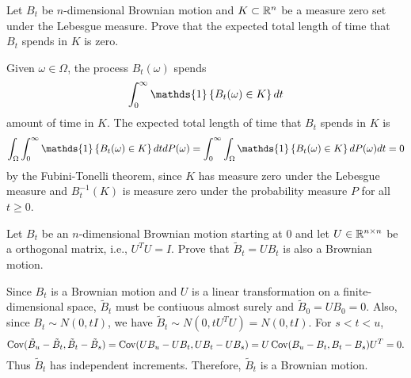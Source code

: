 \begin{exercise}{2.14}\label{ex:2.14}
    Let $B_t$ be $n$-dimensional Brownian motion and $K\subset\mathbb{R}^n$ be a measure 
    zero set under the Lebesgue measure. Prove that the expected total length 
    of time that $B_t$ spends in $K$ is zero. 
\end{exercise}
\begin{solution}
    Given $\omega\in\Omega$, the process $B_t(\omega)$ spends 
    \begin{equation*}
        \int_0^\infty \mathds{1}\set{B_t(\omega)\in K}dt
    \end{equation*} 
    amount of time in $K$. The expected total length of time that $B_t$ spends 
    in $K$ is 
    \begin{equation*}
        \int_{\Omega}\int_0^\infty\mathds{1}\set{B_t(\omega)\in K}dtdP(\omega) 
        = \int_0^\infty\int_{\Omega}\mathds{1}\set{B_t(\omega)\in K}dP(\omega)dt 
        = 0
    \end{equation*}
    by the Fubini-Tonelli theorem, since $K$ has measure zero under the Lebesgue measure 
    and $B_t^{-1}(K)$ is measure zero under the probability measure $P$ for all $t\geq 0$.
\end{solution}

\begin{exercise}{2.15}\label{ex:2.15}
    Let $B_t$ be an $n$-dimensional Brownian motion starting at $0$ and let 
    $U\in\mathbb{R}^{n\times n}$ be a orthogonal matrix, i.e., $U^TU = I$. Prove that 
    $\tilde{B}_t = UB_t$ is also a Brownian motion. 
\end{exercise}
\begin{solution}
    Since $B_t$ is a Brownian motion and $U$ is a linear transformation on a 
    finite-dimensional space, $\tilde{B}_t$ must be contiuous almost surely 
    and $\tilde{B}_0 = UB_0 = 0$. Also, since $B_t\sim N(0, tI)$, we have 
    $\tilde{B}_t\sim N(0, tU^TU) = N(0, tI)$. For $s<t<u$, 
    \begin{equation*}
        \operatorname{Cov}(\tilde{B}_u - \tilde{B}_t, \tilde{B}_t - \tilde{B}_s) 
        = \operatorname{Cov}(UB_u - UB_t, UB_t - UB_s) 
        = U\operatorname{Cov}(B_u - B_t, B_t - B_s)U^T = 0.
    \end{equation*}
    Thus $\tilde{B}_t$ has independent increments. Therefore, $\tilde{B}_t$ 
    is a Brownian motion.
\end{solution}

